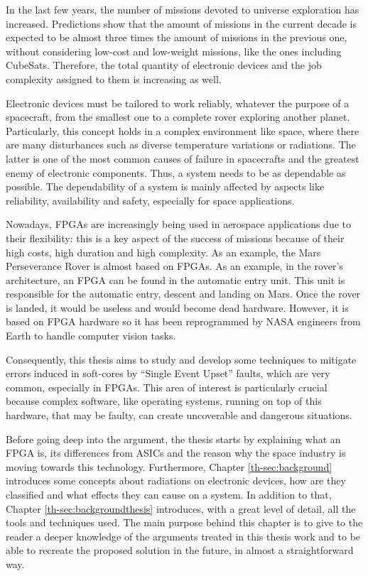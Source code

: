 In the last few years, the number of missions devoted to universe exploration has increased. Predictions show that the amount of missions in the current decade is expected to be almost three times the amount of missions in the previous one, without considering low-cost and low-weight missions, like the ones including CubeSats. Therefore, the total quantity of electronic devices and the job complexity assigned to them is increasing as well.\bigskip

Electronic devices must be tailored to work reliably, whatever the purpose of a spacecraft, from the smallest one to a complete rover exploring another planet. Particularly, this concept holds in a complex environment like space, where there are many disturbances such as diverse temperature variations or radiations. The latter is one of the most common causes of failure in spacecrafts and the greatest enemy of electronic components. Thus, a system needs to be as dependable as possible. The dependability of a system is mainly affected by aspects like reliability, availability and safety, especially for space applications.\bigskip

Nowadays, FPGAs are increasingly being used in aerospace applications due to their flexibility: this is a key aspect of the success of missions because of their high costs, high duration and high complexity. As an example, the Mars Perseverance Rover is almost based on FPGAs. As an example, in the rover's architecture, an FPGA can be found in the automatic entry unit. This unit is responsible for the automatic entry, descent and landing on Mars. Once the rover is landed, it would be useless and would become dead hardware. However, it is based on FPGA hardware so it has been reprogrammed by NASA engineers from Earth to handle computer vision tasks. \bigskip

Consequently, this thesis aims to study and develop some techniques to mitigate errors induced in soft-cores by “Single Event Upset” faults, which are very common, especially in FPGAs. This area of interest is particularly crucial because complex software, like operating systems, running on top of this hardware, that may be faulty, can create uncoverable and dangerous situations. \bigskip

Before going deep into the argument, the thesis starts by explaining what an FPGA is, its differences from ASICs and the reason why the space industry is moving towards this technology. Furthermore, Chapter \ref{th-sec:background} introduces some concepts about radiations on electronic devices, how are they classified and what effects they can cause on a system. In addition to that, Chapter \ref{th-sec:backgroundthesis} introduces, with a great level of detail, all the tools and techniques used. The main purpose behind this chapter is to give to the reader a deeper knowledge of the arguments treated in this thesis work and to be able to recreate the proposed solution in the future, in almost a straightforward way. \bigskip

